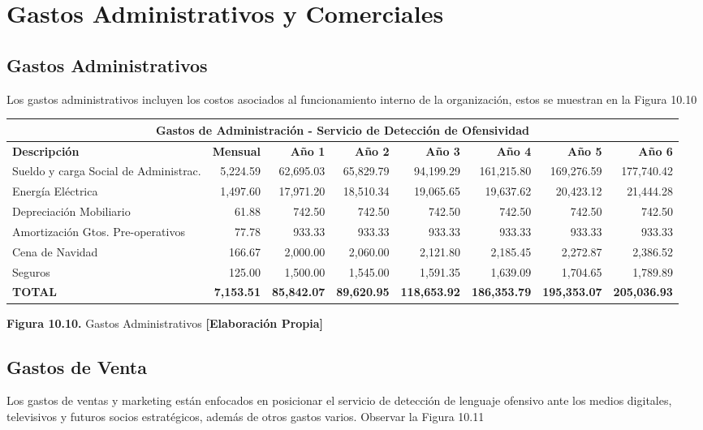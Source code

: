 \section{Gastos Administrativos y Comerciales}

\subsection{Gastos Administrativos}

Los gastos administrativos incluyen los costos asociados al funcionamiento interno de la organización, estos se muestran en la Figura 10.10

\begin{table}[H]
\centering
\scriptsize
\renewcommand{\arraystretch}{1.15}
\setlength{\tabcolsep}{4pt}
\begin{tabular}{|l|r|r|r|r|r|r|r|}
\hline
\multicolumn{8}{|c|}{\textbf{Gastos de Administración - Servicio de Detección de Ofensividad}} \\ \hline
\textbf{Descripción} & \textbf{Mensual} & \textbf{Año 1} & \textbf{Año 2} & \textbf{Año 3} & \textbf{Año 4} & \textbf{Año 5} & \textbf{Año 6} \\ \hline
Sueldo y carga Social de Administrac. & 5,224.59 & 62,695.03 & 65,829.79 & 94,199.29 & 161,215.80 & 169,276.59 & 177,740.42 \\ \hline
Energía Eléctrica & 1,497.60 & 17,971.20 & 18,510.34 & 19,065.65 & 19,637.62 & 20,423.12 & 21,444.28 \\ \hline
Depreciación Mobiliario & 61.88 & 742.50 & 742.50 & 742.50 & 742.50 & 742.50 & 742.50 \\ \hline
Amortización Gtos. Pre-operativos & 77.78 & 933.33 & 933.33 & 933.33 & 933.33 & 933.33 & 933.33 \\ \hline
Cena de Navidad & 166.67 & 2,000.00 & 2,060.00 & 2,121.80 & 2,185.45 & 2,272.87 & 2,386.52 \\ \hline
Seguros & 125.00 & 1,500.00 & 1,545.00 & 1,591.35 & 1,639.09 & 1,704.65 & 1,789.89 \\ \hline
\textbf{TOTAL} & \textbf{7,153.51} & \textbf{85,842.07} & \textbf{89,620.95} & \textbf{118,653.92} & \textbf{186,353.79} & \textbf{195,353.07} & \textbf{205,036.93} \\ \hline
\end{tabular}

\vspace{0.2cm}
\textbf{Figura 10.10.} Gastos Administrativos \textbf{[Elaboración Propia]}
\end{table}

\subsection{Gastos de Venta}

Los gastos de ventas y marketing están enfocados en posicionar el servicio de detección de lenguaje ofensivo ante los medios digitales, televisivos y futuros socios estratégicos, además de otros gastos varios. Observar la Figura 10.11
